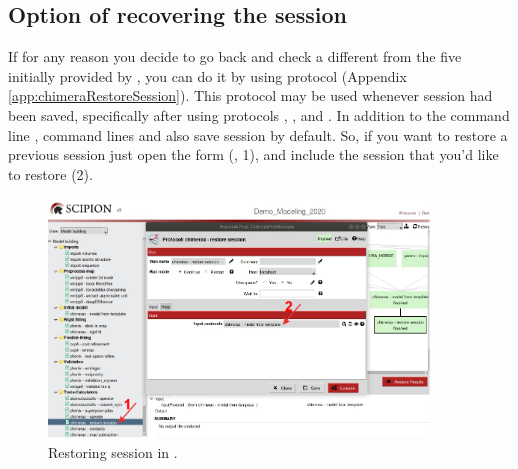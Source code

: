 \subsection*{Option of recovering the \chimera session}
If for any reason you decide to go back and check a different  from the five  initially provided by \modeller, you can do it by using  protocol (Appendix \ref{app:chimeraRestoreSession}). This protocol may be used whenever \chimera session had been saved, specifically after using protocols \chimera {}, \chimera {}, \chimera {} and \chimera {}. In addition to the \chimera command line , command lines  and  also save \chimera session by default. So, if you want to restore a previous session just open the form (, 1), and include the session that you'd like to restore (2).

 \begin{figure}[H]
  \centering 
  \captionsetup{width=.7\linewidth} 
  \includegraphics[width=0.90\textwidth]{Images/Fig17}
  \caption{Restoring session in \chimera.}
  \label{fig:restore_session_protocol}
  \end{figure}
